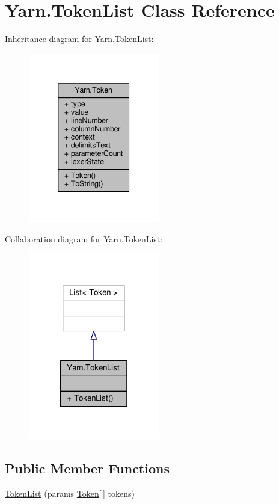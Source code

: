 \hypertarget{a00177}{\section{Yarn.\-Token\-List Class Reference}
\label{a00177}
}


Inheritance diagram for Yarn.\-Token\-List\-:
\nopagebreak
\begin{figure}[H]
\begin{center}
\leavevmode
\includegraphics[width=162pt]{a00646}
\end{center}
\end{figure}


Collaboration diagram for Yarn.\-Token\-List\-:
\nopagebreak
\begin{figure}[H]
\begin{center}
\leavevmode
\includegraphics[width=162pt]{a00647}
\end{center}
\end{figure}
\subsection*{Public Member Functions}
\begin{DoxyCompactItemize}
\item 
\hyperlink{a00177_a9b7cf7c495a19faa91a1b5991d7748ef}{Token\-List} (params \hyperlink{a00175}{Token}\mbox{[}$\,$\mbox{]} tokens)
\end{DoxyCompactItemize}


